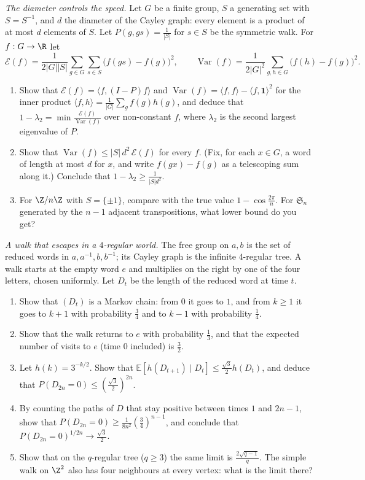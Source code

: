 \begin{exercise}[$\star\star\star$]\label{pb:gapdiam}
\emph{The diameter controls the speed.} Let $G$ be a finite group, $S$ a generating set with $S=S^{-1}$, and $d$ the diameter of the
Cayley graph: every element is a product of at most $d$ elements of $S$. Let $P(g,gs)=\frac1{|S|}$ for $s\in S$ be the symmetric walk.
For $f:G\to\R$ let
\[
\mathcal E(f)=\frac1{2|G||S|}\sum_{g\in G}\sum_{s\in S}\bigl(f(gs)-f(g)\bigr)^2,\qquad\operatorname{Var}(f)=\frac1{2|G|^2}\sum_{g,h\in G}\bigl(f(h)-f(g)\bigr)^2.
\]
\begin{enumerate}[label=(\alph*)]
\item Show that $\mathcal E(f)=\langle f,(I-P)f\rangle$ and $\operatorname{Var}(f)=\langle f,f\rangle-\langle f,\mathbf 1\rangle^2$ for the inner product $\langle f,h\rangle=\frac1{|G|}\sum_gf(g)h(g)$, and deduce
that $1-\lambda_2=\min\frac{\mathcal E(f)}{\operatorname{Var}(f)}$ over non-constant $f$, where $\lambda_2$ is the second largest eigenvalue of $P$.
\item Show that $\operatorname{Var}(f)\le|S|\,d^2\,\mathcal E(f)$ for every $f$. (Fix, for each $x\in G$, a word of length at most $d$ for $x$, and write $f(gx)-f(g)$ as a
telescoping sum along it.) Conclude that $1-\lambda_2\ge\frac1{|S|d^2}$.
\item For $\Z/n\Z$ with $S=\{\pm1\}$, compare with the true value $1-\cos\frac{2\pi}n$. For $\mathfrak S_n$ generated by the $n-1$ adjacent transpositions,
what lower bound do you get?
\end{enumerate}
\end{exercise}

\begin{exercise}[$\star\star\star$]\label{pb:treewalk}
\emph{A walk that escapes in a $4$-regular world.} The free group on $a,b$ is the set of reduced words in $a,a^{-1},b,b^{-1}$; its Cayley
graph is the infinite $4$-regular tree. A walk starts at the empty word $e$ and multiplies on the right by one of the four
letters, chosen uniformly. Let $D_t$ be the length of the reduced word at time $t$.
\begin{enumerate}[label=(\alph*)]
\item Show that $(D_t)$ is a Markov chain: from $0$ it goes to $1$, and from $k\ge1$ it goes to $k+1$ with probability $\frac34$ and to
$k-1$ with probability $\frac14$.
\item Show that the walk returns to $e$ with probability $\frac13$, and that the expected number of visits to $e$ (time $0$ included) is $\frac32$.
\item Let $h(k)=3^{-k/2}$. Show that $\mathbb E[h(D_{t+1})\mid D_t]\le\frac{\sqrt3}2h(D_t)$, and deduce that $P(D_{2n}=0)\le(\frac{\sqrt3}2)^{2n}$.
\item By counting the paths of $D$ that stay positive between times $1$ and $2n-1$, show that $P(D_{2n}=0)\ge\frac1{8n^2}(\frac34)^{n-1}$, and conclude that
$P(D_{2n}=0)^{1/2n}\to\frac{\sqrt3}2$.
\item Show that on the $q$-regular tree ($q\ge3$) the same limit is $\frac{2\sqrt{q-1}}q$. The simple walk on $\Z^2$ also has four neighbours at
every vertex: what is the limit there?
\end{enumerate}
\end{exercise}

